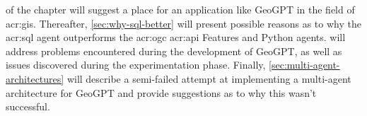 \begin{comment}

In this section it is important to include a discussion of not just the merits of the work conducted, but also the limitations.
Which choices did you make? Why? What alternatives were there?
{\color{red}\textbf{Note that a key part of the Master's Thesis grading is based on the student's ability to discuss the results in light of the work by others as well as the restrictions and potential of the work itself.}}
While the Results section will report the outcome of each specific experiments, the Discussion should put those results into perspective and look at overall lessons that can be learned from the entire series of experiments.

You should be able to discuss your work in relation to its overall goal and your research questions (i.e., those introduced in Chapter~\ref{cha:introduction}),
but also address issues such as any ethical considerations that the work may entail,
as well as its technical challenges and limitations.

Discussion and evaluation can either be two different chapters, a joint chapter (as here), or part of the concluding chapter
--- or the discussion can be part of that chapter while the evaluation is part of the experimental chapter.

As for most parts of the thesis, it is possible to select various outlines and setups for the discussion; the important thing is that all the relevant parts appear \textit{somewhere\/} in the text.
\end{comment}

 of the  chapter will suggest a place for an application like GeoGPT in the field of \acrshort{acr:gis}. Thereafter, \autoref{sec:why-sql-better} will present possible reasons as to why the \acrshort{acr:sql} agent outperforms the \acrshort{acr:ogc} \acrshort{acr:api} Features and Python agents.  will address problems encountered during the development of GeoGPT, as well as issues discovered during the experimentation phase. Finally, \autoref{sec:multi-agent-architectures} will describe a semi-failed attempt at implementing a multi-agent architecture for GeoGPT and provide suggestions as to why this wasn't successful.




